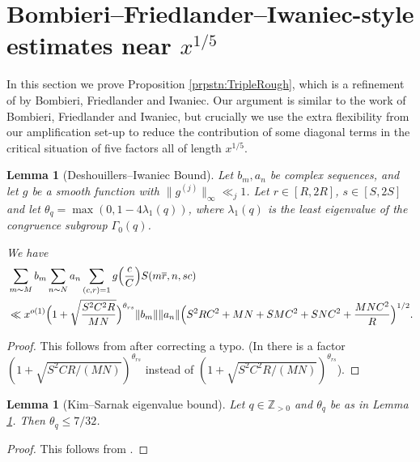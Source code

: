 \documentclass[10pt]{amsart}
\theoremstyle{plain}
\newtheorem{lmm}[thrm]{Lemma}
\numberwithin{equation}{section}
\begin{document}
\section{Bombieri--Friedlander--Iwaniec-style estimates near \texorpdfstring{$x^{1/5}$}{x\^{}(1/5)}}\label{sec:BFI}
%
%
%
%
In this section we prove Proposition \ref{prpstn:TripleRough}, which is a refinement of \cite[Theorem 4]{BFI2} by Bombieri, Friedlander and Iwaniec. Our argument is similar to the work of Bombieri, Friedlander and Iwaniec, but crucially we use the extra flexibility from our amplification set-up to reduce the contribution of some diagonal terms in the critical situation of five factors all of length $x^{1/5}$.
%
%
%
%
%
%
%
%
\begin{lmm}[Deshouillers--Iwaniec Bound]\label{lmm:DeshouillersIwaniec2}
Let $b_m,a_n$ be complex sequences, and let $g$ be a smooth function with $\|g^{(j)}\|_\infty\ll_j 1$. Let $r\in[R,2R]$, $s\in[S,2S]$ and let $\theta_{q}=\max(0,1-4\lambda_1(q))$, where $\lambda_1(q)$ is the least eigenvalue of the congruence subgroup $\Gamma_0(q)$.

We have
\begin{align*}
&\sum_{m\sim M}b_m\sum_{n\sim N}a_n\sum_{(c,r)=1}g\Bigl(\frac{c}{C}\Bigr)S(m\overline{r},n,sc)\\
&\ll x^{o(1)}\Bigl(1+\sqrt\frac{S^2 C^2 R}{MN}\Bigr)^{\theta_{rs}}\|b_m\|\|a_n\|\Bigl(S^2RC^2+MN+S MC^2+S NC^2+\frac{ M N C^2}{R}\Bigr)^{1/2}.
\end{align*}
\end{lmm}
%
%
%
%
\begin{proof}
This follows from \cite[Theorem 9]{DeshouillersIwaniec} after correcting a typo. (In \cite[Theorem 9]{DeshouillersIwaniec} there is a factor $(1+\sqrt{S^2 C R/(MN)})^{\theta_{rs}}$ instead of $(1+\sqrt{S^2 C^2 R/(MN)})^{\theta_{rs}}$).
\end{proof}
%
%
%
%
%
%
%
%
\begin{lmm}[Kim--Sarnak eigenvalue bound]\label{lmm:KimSarnak}
Let $q\in\mathbb{Z}_{>0}$ and $\theta_q$ be as in Lemma \ref{lmm:DeshouillersIwaniec2}. Then $\theta_q\le 7/32$.
\end{lmm}
%
%
%
%
\begin{proof}
This follows from \cite[Appendix, Proposition 2]{KimSarnak}.
\end{proof}
%
%
%
%
%
%
%
%
\end{document}

